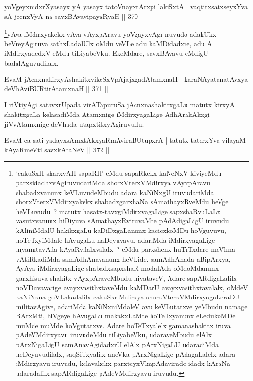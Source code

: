 \begin{shl}
yoVgeyxnidxrXyasayx yA yasayx tatoV\s nayxtArxpi lakiSxtA |
vaqtitxsatxseyxYva sA jecnxVyA na savxBAvavipayaRyaH \hfill || 370 ||
\end{shl}

\begin{artha}
\footnote{`cakuSxH sharxvAH sapaRH' eMdu sapaRkekx kaNeNxV kiviyeMdu parxsidadhxvAgiruvudariMda shorxVterxVMdirxya vAyxpAravu shabadxvanunx keVLuvudeMbudu adara kaNiNxgU iruvudariMda shorxVterxVMdirxyakekx shabadxgarxhaNa sAmathayxRveMdu heVge heVLuvudu~? matutx hasatx-tavxgiMdirxyagaLige sapxshaRvuLaLx vasutxvanunx hiDiyuva sAmathayxRviruvaMte pAdAdigaLigU iruvudu kAliniMdalU hakikxgaLu kaDiDxgaLanunx kacicxkoMDu hoVguvuvu, hoTeTxyiMdale hAvugaLu naDeyuvavu, adariMda iMdirxyagaLige niyamitavAda kAyaRvilalxvalalx~? eMdu parxshenx huTiTxdare meVlina vAtiRkadiMda samAdhAnavanunx heVLide. samAdhAnada aBipArxya, AyAya iMdirxyagaLige shabadxsapxshaR modalAda oMdoMdanunx garxhisuva shakitx vAyxpAraveMbudu niyataveV, Adare sapARdigaLalilx noVDuvavarige avayxvasithxtaveMdu kaMDarU avayxvasithxtavalalx, oMdeV kaNiNxna goVLakadalilx cakuSxriMdirxya shorxVterxVMdirxyagaLeraDU militavAgive, adariMda kaNiNxniMdaleV avu keVLutatxve yeMbudu namage BArxMti, hiVgeye hAvugaLu makakxLaMte hoTeTxyanunx eLedukoMDe muMde muMde hoVgutatxve. Adare hoTeTxyalelx gamanashakitx iruva pAdeVMdirxyavu iruvudeMdu tiLiyabeVku, udaraveMbudu elAlx pArxNigaLigU samAnavAgidadxrU elAlx pArxNigaLU udaradiMda neDeyuvudilalx, saqSiTxyalilx aneVka pArxNigaLige pAdagaLalelx adara iMdirxyavu iruvudu, kelavakekx parxteyxVkapAdavirade idadx kAraNa udaradalilx sapARdigaLige pAdeVMdirxyavu iruvudu.}yAva iMdirxyakekx yAva vAyxpAravu yoVgayxvAgi iruvudo adakUkx beVreyAgiruva sathxLadalUlx oMdu veVLe adu kaMDidadxre, adu A iMdirxyadedxV eMdu tiLiyabeVku. EkeMdare, savxBAvavu eMdigU badalAguvudilalx.
\end{artha}

\begin{shl}
EvaM jAcnxnakirxyAshakitxvikeSxVpAjajxgadAtamxnaH |
karaNAyatanatAvxya deVhAviBURtirAtamxnaH \hfill || 371 ||
\end{shl}

\begin{artha}
I riVtiyAgi satavxrUpada virATapuruSa jAcnxnashakitxgaLu matutx kirxyA shakitxgaLa kelasadiMda Atamxnige iMdirxyagaLige AdhArakAkxgi jiVvAtamxnige deVhada utapxtitxyAgiruvudu.
\end{artha}

\begin{shl}
EvaM ca sati yadayxsAmxtAkxyaRmAviraBUtupxrA |
tatutx taterxYva vilayaM kAyaRmeVti savxkAraNeV \hfill || 372 ||
\end{shl}

